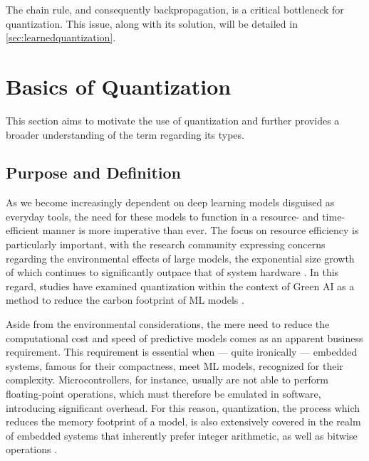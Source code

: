 The chain rule, and consequently backpropagation, is a critical bottleneck for quantization. 
This issue, along with its solution, will be detailed in \cref{sec:learnedquantization}.


\section{Basics of Quantization}
\label{sec:basicsofquantization}
\hspace*{1em}This section aims to motivate the use of quantization  
and further provides a broader understanding of the term regarding its types.


\subsection{Purpose and Definition}
\label{subsec:purposeanddefinition}
\hspace*{1em}As we become increasingly dependent on deep learning models disguised as everyday tools, 
the need for these models to function in a resource- and time-efficient manner is more imperative than ever. 
The focus on resource efficiency is particularly important, 
with the research community expressing concerns regarding the environmental effects of large models, 
the exponential size growth of which continues to significantly outpace that of system hardware \cite{DBLP:journals/corr/abs-2111-00364}. 
In this regard, studies have examined quantization within the context of Green AI as a method to reduce the carbon footprint of
ML models \cite{DBLP:journals/csi/RegueroMV25}.

Aside from the environmental considerations, the mere need to reduce 
the computational cost and speed of predictive models
comes as an apparent business requirement. 
This requirement is essential when — quite ironically — embedded systems, famous for their compactness, meet 
ML models, recognized for their complexity. Microcontrollers, for instance, 
usually are not able to perform floating-point operations, which must therefore be emulated in software, 
introducing significant overhead. 
For this reason, quantization,
the process which reduces the memory footprint of a model,
is also extensively covered in the realm of embedded systems that 
inherently prefer integer arithmetic, as well as bitwise operations \cite{rastegari2016xnor, DBLP:conf/eccv/ZhangYYH18, DBLP:conf/codit/KhalifaM24, DBLP:journals/corr/abs-2105-13331}.


